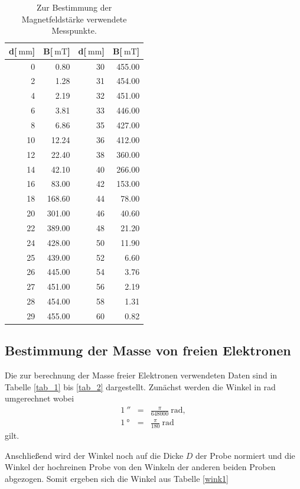 \begin{table}
	\centering
	\caption[]{Zur Bestimmung der Magnetfeldstärke verwendete Messpunkte.}
	\begin{tabular}{r r r r}
		\toprule
		d[$\SI{}{\milli\meter}$] & B[$\SI{}{\milli\tesla}$] & d[$\SI{}{\milli\meter}$] & B[$\SI{}{\milli\tesla}$]\\
		\midrule
		 0	&	  0.80	&	30	&	455.00\\
		 2	&	  1.28	&	31	&	454.00\\
		 4	&	  2.19	&	32	&	451.00\\
		 6	&	  3.81	&	33	&	446.00\\
		 8	&	  6.86	&	35	&	427.00\\
		10	&	 12.24	&	36	&	412.00\\
		12	&	 22.40	&	38	&	360.00\\
		14	&	 42.10	&	40	&	266.00\\
		16	&	 83.00	&	42	&	153.00\\
		18	&	168.60	&	44	&	 78.00\\
		20	&	301.00	&	46	&	 40.60\\
		22	&	389.00	&	48	&	 21.20\\
		24	&	428.00	&	50	&	 11.90\\
		25	&	439.00	&	52	&	  6.60\\
		26	&	445.00	&	54	&	  3.76\\
		27	&	451.00	&	56	&	  2.19\\
		28	&	454.00	&	58	&	  1.31\\
		29	&	455.00	&	60	&	  0.82\\
		\bottomrule
	\end{tabular}
	\label{tab_mag}
\end{table}
\FloatBarrier
\subsection{Bestimmung der Masse von freien Elektronen} %
\label{sub:bestimmung_der_masse_von_freien_elektronen}

Die zur berechnung der Masse freier Elektronen verwendeten Daten sind in Tabelle \ref{tab_1} bis \ref{tab_2} dargestellt.
Zunächst werden die Winkel in rad umgerechnet wobei
\begin{eqnarray*}
	1\SI{}{\arcsecond} &=& \frac{\pi}{648000}\SI{}{\radian},\\
	1\SI{}{\degree} &=& \frac{\pi}{180}\SI{}{\radian}
\end{eqnarray*}
gilt.

Anschließend wird der Winkel noch auf die Dicke $D$ der Probe normiert und die Winkel der hochreinen Probe von den Winkeln der anderen beiden Proben abgezogen.
Somit ergeben sich die Winkel aus Tabelle \ref{wink1}


